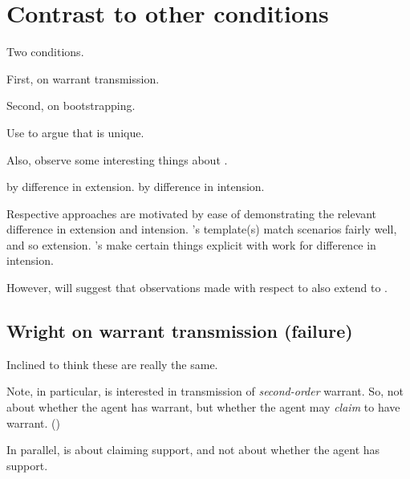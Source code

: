 \section{Contrast to other conditions}
\label{sec:contr-other-cond}

\begin{note}
  Two conditions.

  First, \citeauthor{Wright:2011wn} on warrant transmission.

  Second, \citeauthor{Weisberg:2010to} on bootstrapping.
\end{note}

\begin{note}
  Use to argue that \nI{} is unique.

  Also, observe some interesting things about \nI{}.

  \citeauthor{Wright:2011wn} by difference in extension.
  \citeauthor{Weisberg:2010to} by difference in intension.

  Respective approaches are motivated by ease of demonstrating the relevant difference in extension and intension.
  \citeauthor{Wright:2011wn}'s template(s) match scenarios fairly well, and so extension.
  \citeauthor{Weisberg:2010to}'s make certain things explicit with work for difference in intension.

  However, will suggest that observations made with respect to \citeauthor{Weisberg:2010to} also extend to \citeauthor{Wright:2011wn}.
\end{note}

\subsection{Wright on warrant transmission (failure)}

\begin{note}
  Inclined to think these are really the same.

  Note, in particular, \citeauthor{Wright:2000tq} is interested in transmission of \emph{second-order} warrant.
  So, not about whether the agent has warrant, but whether the agent may \emph{claim} to have warrant.
  (\Citeyear[89]{Wright:2011wn})

  In parallel, \nI{} is about claiming support, and not about whether the agent has support.
\end{note}

